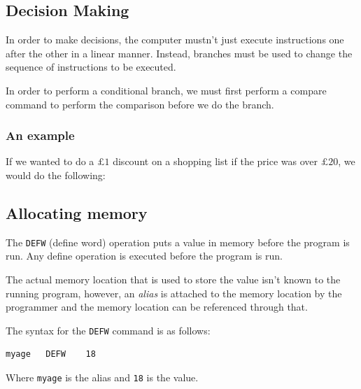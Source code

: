 \documentclass{article}
\begin{document}
\subsection{Decision Making}

In order to make decisions, the computer mustn't just execute instructions one after the other in a linear manner. Instead, branches must be used to change the sequence of instructions to be executed.

In order to perform a conditional branch, we must first perform a compare command to perform the comparison before we do the branch.

\subsubsection{An example}

If we wanted to do a $£1$ discount on a shopping list if the price was over $£20$, we would do the following:


\subsection{Allocating memory}

The \texttt{DEFW} (define word) operation puts a value in memory before the program is run. Any define operation is executed before the program is run.

The actual memory location that is used to store the value isn't known to the running program, however, an {\it alias} is attached to the memory location by the programmer and the memory location can be referenced through that.

The syntax for the \texttt{DEFW} command is as follows:

\begin{verbatim}
myage	DEFW	18
\end{verbatim}

Where {\tt myage} is the alias and {\tt 18} is the value.
\end{document}
